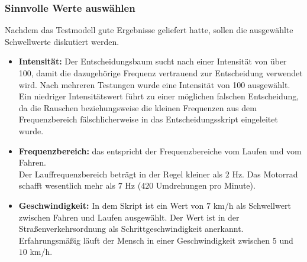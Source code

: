 %
%




\subsubsection{Sinnvolle Werte auswählen}
Nachdem das Testmodell gute Ergebnisse geliefert hatte, sollen die ausgewählte Schwellwerte diskutiert werden.
\begin{itemize}
	\item \textbf{Intensität:} Der Entscheidungsbaum sucht nach einer Intensität von über 100, damit die dazugehörige Frequenz vertrauend zur Entscheidung verwendet wird. Nach mehreren Testungen wurde eine Intensität von 100 ausgewählt. Ein niedriger Intensitätswert führt zu einer möglichen falschen Entscheidung, da die Rauschen beziehungsweise die kleinen Frequenzen aus dem Frequenzbereich fälschlicherweise in das Entscheidungsskript eingeleitet wurde.
	\item \textbf{Frequenzbereich:} das entspricht der Frequenzbereiche vom Laufen und vom Fahren.\\
	Der Lauffrequenzbereich beträgt in der Regel kleiner als $2$ Hz. Das Motorrad schafft wesentlich mehr als $7$ Hz ($420$ Umdrehungen pro Minute). 
	\item \textbf{Geschwindigkeit:} In dem Skript ist ein Wert von $7$ km/h als Schwellwert zwischen Fahren und Laufen ausgewählt. Der Wert ist in der Straßenverkehrsordnung als Schrittgeschwindigkeit anerkannt\citep{Bussgeldkataloge2022}. Erfahrungsmäßig läuft der Mensch in einer Geschwindigkeit zwischen $5$ und $10$ km/h.
\end{itemize}



